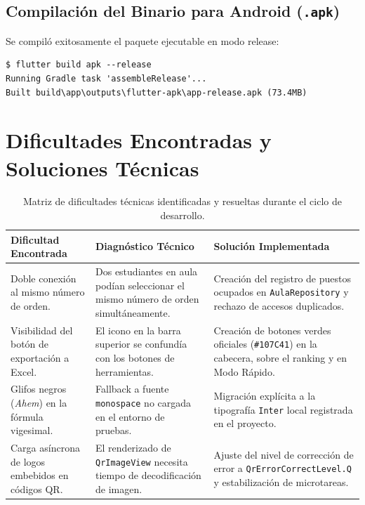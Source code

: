 \documentclass[12pt,a4paper]{article}
\begin{document}
\subsection{Compilación del Binario para Android (\texttt{.apk})}
Se compiló exitosamente el paquete ejecutable en modo release:
\begin{verbatim}
$ flutter build apk --release
Running Gradle task 'assembleRelease'...
Built build\app\outputs\flutter-apk\app-release.apk (73.4MB)
\end{verbatim}

\section{Dificultades Encontradas y Soluciones Técnicas}

\begin{table}[H]
\centering
\small
\begin{tabularx}{\textwidth}{p{4.2cm}p{5.5cm}X}
\toprule
\textbf{Dificultad Encontrada} & \textbf{Diagnóstico Técnico} & \textbf{Solución Implementada} \\
\midrule
Doble conexión al mismo número de orden. & Dos estudiantes en aula podían seleccionar el mismo número de orden simultáneamente. & Creación del registro de puestos ocupados en \texttt{AulaRepository} y rechazo de accesos duplicados. \\
\addlinespace
Visibilidad del botón de exportación a Excel. & El icono en la barra superior se confundía con los botones de herramientas. & Creación de botones verdes oficiales (\texttt{\#107C41}) en la cabecera, sobre el ranking y en Modo Rápido. \\
\addlinespace
Glifos negros (\textit{Ahem}) en la fórmula vigesimal. & Fallback a fuente \texttt{monospace} no cargada en el entorno de pruebas. & Migración explícita a la tipografía \texttt{Inter} local registrada en el proyecto. \\
\addlinespace
Carga asíncrona de logos embebidos en códigos QR. & El renderizado de \texttt{QrImageView} necesita tiempo de decodificación de imagen. & Ajuste del nivel de corrección de error a \texttt{QrErrorCorrectLevel.Q} y estabilización de microtareas. \\
\bottomrule
\end{tabularx}
\caption{Matriz de dificultades técnicas identificadas y resueltas durante el ciclo de desarrollo.}
\end{table}
\end{document}
